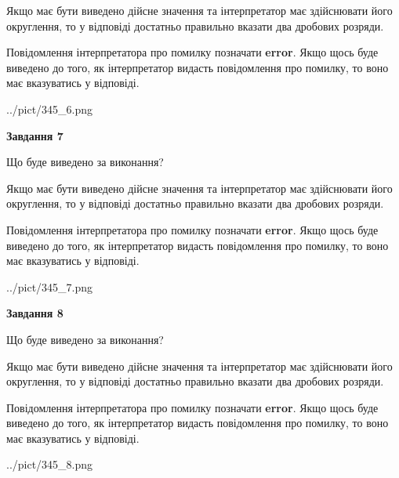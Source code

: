 \documentclass[12pt, ukrainian]{article}
\begin{document}
{\begin {Large}
Якщо має бути виведено дійсне значення та інтерпретатор має здійснювати його округлення, 
то у відповіді достатньо правильно вказати два дробових розряди.

Повідомлення інтерпретатора про помилку позначати \textbf{error}.
Якщо щось буде виведено до того, як інтерпретатор видасть повідомлення про помилку, 
то воно має вказуватись у відповіді. \par

\begin{center}
	{../pict/345_6.png}
\end{center}
\newpage

{\begin {center}\textbf{Завдання 7}\end {center}}\par
Що буде виведено за виконання? \par

Якщо має бути виведено дійсне значення та інтерпретатор має здійснювати його округлення, 
то у відповіді достатньо правильно вказати два дробових розряди.

Повідомлення інтерпретатора про помилку позначати \textbf{error}.
Якщо щось буде виведено до того, як інтерпретатор видасть повідомлення про помилку, 
то воно має вказуватись у відповіді. \par

\begin{center}
	{../pict/345_7.png}
\end{center}
\newpage

{\begin {center}\textbf{Завдання 8}\end {center}}\par
Що буде виведено за виконання? \par

Якщо має бути виведено дійсне значення та інтерпретатор має здійснювати його округлення, 
то у відповіді достатньо правильно вказати два дробових розряди.

Повідомлення інтерпретатора про помилку позначати \textbf{error}.
Якщо щось буде виведено до того, як інтерпретатор видасть повідомлення про помилку, 
то воно має вказуватись у відповіді. \par

\begin{center}
	{../pict/345_8.png}
\end{center}
\newpage


\end{Large}}
\end{document}
